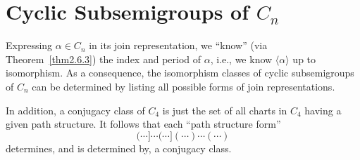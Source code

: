 \documentclass{surv-l}
\numberwithin{equation}{section}
\numberwithin{table}{section}
\numberwithin{figure}{section}
\theoremstyle{definition}
\begin{document}
\section{Cyclic Subsemigroups of $C_{n}$}\label{sec2.7}

Expressing $\alpha\in C_{n}$ in its join representation, we
``know'' (via Theorem~\ref{thm2.6.3}) the index and period of
$\alpha$, i.e., we know $\langle\alpha\rangle$ up to isomorphism.
As a consequence, the isomorphism classes of cyclic subsemigroups
of $C_{n}$ can be determined by listing all possible forms of join
representations.

In addition, a conjugacy class of $C_{4}$ is just the set of all
charts in $C_{4}$ having a given path structure. It follows that
each ``path structure form''
\[
(\cdots]\cdots(\cdots](\cdots)\cdots(\cdots)
\]
determines, and is determined by, a conjugacy class.
\end{document}
